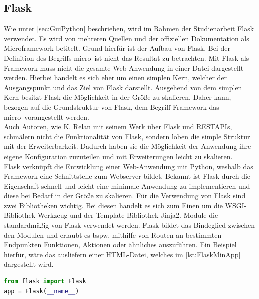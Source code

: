 \documentclass[a4paper,titlepage,halfparskip,12pt]{scrreprt}
\begin{document}
\begin{onehalfspacing}
\section{Flask}
\label{sec:Flask}
Wie unter \autoref{sec:GuiPython} beschrieben, wird im Rahmen der Studienarbeit Flask verwendet. Es wird von mehreren Quellen und der offiziellen Dokumentation als Microframework betitelt. Grund hierfür ist der Aufbau von Flask. Bei der Definition des Begriffs \glqq micro\grqq\ ist nicht das Resultat zu betrachten. Mit Flask als Framework muss nicht die gesamte Web-Anwendung in einer Datei dargestellt werden. Hierbei handelt es sich eher um einen simplen Kern, welcher der Ausgangspunkt und das Ziel von Flask darstellt. Ausgehend von dem simplen Kern besitzt Flask die Möglichkeit in der Größe zu skalieren. Daher kann, bezogen auf die Grundstruktur von Flask, dem Begriff Framework das \glqq micro\grqq\ vorangestellt werden.\cite{FlaskDoc}\\
Auch Autoren, wie K. Relan mit seinem Werk über Flask und RESTAPIs, schmälern nicht die Funktionalität von Flask, sondern loben die simple Struktur mit der Erweiterbarkeit. Dadurch haben sie die Möglichkeit der Anwendung ihre eigene Konfiguration zuzuteilen und mit Erweiterungen leicht zu skalieren. \cite{FlaskRESTAPIsRelan}\\
Flask verknüpft die Entwicklung einer Web-Anwendung mit Python, weshalb das Framework eine Schnittstelle zum Webserver bildet. Bekannt ist Flask durch die Eigenschaft schnell und leicht eine minimale Anwendung zu implementieren und diese bei Bedarf in der Größe zu skalieren. Für die Verwendung von Flask sind zwei Bibliotheken wichtig. Bei diesen handelt es sich zum Einen um die \ac{WSGI}-Bibliothek Werkzeug und der Template-Bibliothek Jinja2. Module die standardmäßig von Flask verwendet werden. Flask bildet das Bindeglied zwischen den Modulen und erlaubt es bspw. mithilfe von Routen an bestimmten Endpunkten Funktionen, Aktionen oder ähnliches auszuführen. Ein Beispiel hierfür, wäre das ausliefern einer \ac{HTML}-Datei, welches im \autoref{lst:FlaskMinApp} dargestellt wird.
\begin{lstlisting}[language=Python,caption=Example Listing of Flask Python,label={lst:FlaskMinApp}]
from flask import Flask
app = Flask(__name__)


\end{lstlisting}
\end{onehalfspacing}
\end{document}
